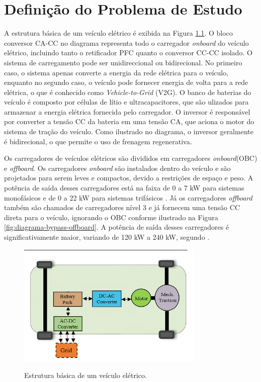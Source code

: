 \chapter{Definição do Problema de Estudo}

A estrutura básica de um veículo elétrico é exibida na Figura
\ref{fig:estrutura-veiculo-eletrico}. O bloco conversor CA-CC no diagrama representa todo o
carregador \textit{onboard} do veículo elétrico, incluindo tanto o retificador PFC quanto o
conversor CC-CC isolado. O sistema de carregamento pode ser unidireccional ou bidirecional. No
primeiro caso, o sistema apenas converte a energia da rede elétrica para o veículo, enquanto no
segundo caso, o veículo pode fornecer energia de volta para a rede elétrica, o que é conhecido
como \textit{Vehicle-to-Grid} (V2G). O banco de baterias do veículo é composto por células de
lítio e ultracapacitores, que são ulizados para armazenar a energia elétrica fornecida pelo
carregador. O inversor é responsável por converter a tensão CC da bateria em uma tensão CA, que
aciona o motor do sistema de tração do veículo. Como ilustrado no diagrama, o inversor
geralmente é bidirecional, o que permite o uso de frenagem regenerativa.

Os carregadores de veículos elétricos são divididos em carregadores \textit{onboard}(OBC) e
\textit{offboard}. Os carregadores \textit{onboard} são instalados dentro do veículo e são
projetados para serem leves e compactos, devido a restrições de espaço e peso. A potência de
saída desses carregadores está na faixa de 0 a 7 kW para sistemas monofásicos e de 0 a 22 kW
para sistemas trifásicos \cite{Yuan:2021}. Já os carregadores \textit{offboard} também são
chamados de carregadores nível 3 e já fornecem uma tensão CC direta para o veículo, ignorando o
OBC conforme ilustrado na Figura \ref{fig:diagrama-bypass-offboard}. A potência de saída desses
carregadores é significativamente maior, variando de 120 kW a 240 kW, segundo
\cite{texas:2020}.

\begin{figure}[htb]
    \centering
    \caption{Estrutura básica de um veículo elétrico.}
    \includegraphics[width=0.8\textwidth]{Figuras/diagrama_veiculo_eletrico_edit.png}
    \label{fig:estrutura-veiculo-eletrico}
\end{figure}

